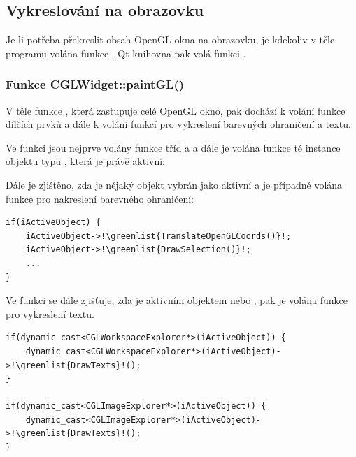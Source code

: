 \subsection*{Vykreslování na obrazovku}
Je-li potřeba překreslit obsah OpenGL okna na obrazovku, je kdekoliv v těle programu volána funkce . Qt knihovna pak volá funkci .

\subsubsection*{Funkce CGLWidget::paintGL()}
V těle funkce , která zastupuje celé OpenGL okno, pak dochází k volání funkce  dílčích prvků a dále k volání funkcí pro vykreslení barevných ohraničení a textu.

Ve funkci  jsou nejprve volány funkce  tříd  a  a dále je volána funkce  té instance objektu typu , která je právě aktivní:


Dále je zjištěno, zda je nějaký objekt vybrán jako aktivní a je případně volána funkce pro nakreslení barevného ohraničení:

\begin{lstlisting}[caption={Pokud je nějaký objekt aktivní je kresleno jeho barevné ohraničení.}]
if(iActiveObject) {
	iActiveObject->!\greenlist{TranslateOpenGLCoords()}!;
	iActiveObject->!\greenlist{DrawSelection()}!;
	...
}
\end{lstlisting}

Ve funkci  se dále zjišťuje, zda je aktivním objektem  nebo , pak je volána funkce pro vykreslení textu.

\begin{lstlisting}[caption={Volání funkce pro vykreslení textu v případě, že aktivním objektem je \clist{CGLWorkspaceExplorer} nebo \clist{CGLImageExplorer} je realizováno operátorem \clist{dynamic\_cast}.}]
if(dynamic_cast<CGLWorkspaceExplorer*>(iActiveObject)) {
	dynamic_cast<CGLWorkspaceExplorer*>(iActiveObject)->!\greenlist{DrawTexts}!();
}

if(dynamic_cast<CGLImageExplorer*>(iActiveObject)) {
	dynamic_cast<CGLImageExplorer*>(iActiveObject)->!\greenlist{DrawTexts}!();
}
\end{lstlisting}

